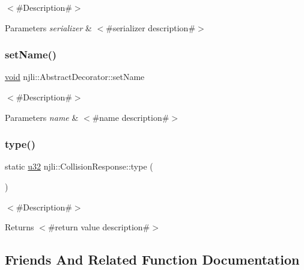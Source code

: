 $<$\#\+Description\#$>$


\begin{DoxyParams}{Parameters}
{\em serializer} & $<$\#serializer description\#$>$ \\
\hline
\end{DoxyParams}
\mbox{\label{classnjli_1_1_collision_response_a087eb5f8d9f51cc476f12f1d10a3cb95}} 
\subsubsection{\texorpdfstring{set\+Name()}{setName()}}
{\footnotesize\ttfamily \mbox{\hyperlink{_thread_8h_af1e856da2e658414cb2456cb6f7ebc66}{void}} njli\+::\+Abstract\+Decorator\+::set\+Name}

$<$\#\+Description\#$>$


\begin{DoxyParams}{Parameters}
{\em name} & $<$\#name description\#$>$ \\
\hline
\end{DoxyParams}
\mbox{\label{classnjli_1_1_collision_response_a38cddefa3c200081852fa1613369857e}} 
\subsubsection{\texorpdfstring{type()}{type()}}
{\footnotesize\ttfamily static \mbox{\hyperlink{_util_8h_a10e94b422ef0c20dcdec20d31a1f5049}{u32}} njli\+::\+Collision\+Response\+::type (\begin{DoxyParamCaption}{ }\end{DoxyParamCaption})\hspace{0.3cm}{\ttfamily [static]}}

$<$\#\+Description\#$>$

\begin{DoxyReturn}{Returns}
$<$\#return value description\#$>$ 
\end{DoxyReturn}


\subsection{Friends And Related Function Documentation}
\mbox{\label{classnjli_1_1_collision_response_acb96ebb09abe8f2a37a915a842babfac}} 

